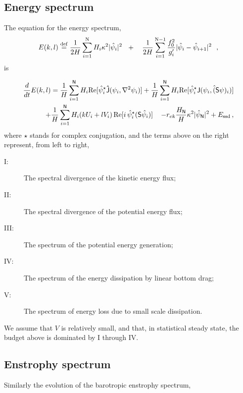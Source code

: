 \documentclass[11pt]{article}
\newcommand{\ssd}{\text{ssd}}
\newcommand{\sS}{\mathsf{S}}
\begin{document}
\subsection*{Energy spectrum}
The equation for the energy spectrum,
\begin{equation}
E(k,l) \stackrel{\mathrm{def}}{=} {\frac{1}{2 H}\sum_{i=1}^{\mathrm{N}} H_i \kappa^2 |\hat{\psi}_i|^2} \,\,\,\,+ \,\,\,\,\,\, {\frac{1}{2 H} \sum_{i=1}^{\mathrm{N}-1} \frac{f_0^2}{g'_i}|\hat{\psi}_{i}- \hat{\psi}_{i+1}|^2}\,\,\,\,,
\end{equation}
is 

\begin{align}
    \frac{d}{dt} E(k,l) = {\frac{1}{H}\sum_{i=1}^{\mathsf{N}} H_i \text{Re}[\hat{\psi}_i^\star {\mathsf{\hat{J}}}(\psi_i,\nabla^2\psi_i)]} +
    {\frac{1}{H}\sum_{i=1}^{\mathsf{N}} H_i\text{Re}[\hat{\psi}_i^\star \hat{\mathsf{J} (\psi_i,(\sS \psi)_i)}]} \nonumber \\
    + {\frac{1}{H}\sum_{i=1}^{\mathsf{N}} H_i ( k U_i +  l V_i)\, \text{Re}[i \, \hat{\psi}^\star_i (\mathsf{S}\hat{\psi}_i)]} \,\,\,\,\,\,\,{- r_{ek} \frac{H_\mathsf{N}}{H} \kappa^2 |\hat{\psi}_{\mathsf{N}}|^2}  +{ {{E_\ssd}}} \com
\end{align}
where $\star$ stands for complex conjugation, and the terms above on the right represent, from
left to right,

\begin{description}
    \item[I:]  The spectral divergence of the kinetic energy flux;
    \item[II:] The spectral divergence of the potential energy flux; 
    \item[III:] The spectrum of the potential energy generation;
    \item[IV:] The spectrum of the energy dissipation by linear bottom drag;
    \item[V:] The spectrum of energy loss due to small scale dissipation.
\end{description}
We assume that $V$ is relatively small, and that, in statistical steady state, the
budget above is dominated by I through IV.

\subsection*{Enstrophy spectrum}
Similarly the evolution of the barotropic enstrophy spectrum,
\end{document}
